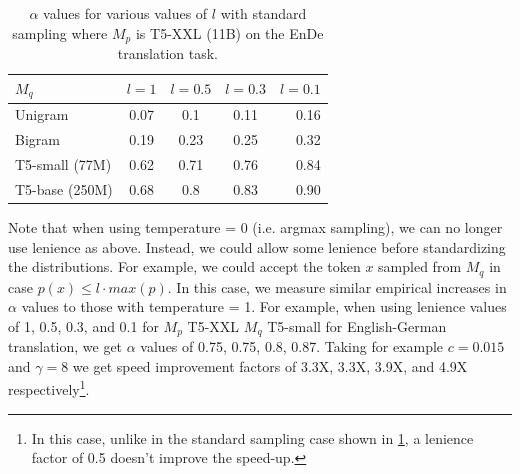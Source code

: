 \documentclass[nohyperref]{article}
\theoremstyle{plain}
\theoremstyle{definition}
\theoremstyle{remark}
\begin{document}
\begin{table}[ht]
  \caption{$\alpha$ values for various values of $l$ with standard sampling where $M_p$ is T5-XXL (11B) on the EnDe translation task.}
  \label{tbl:lenience}
\vskip 0.15in
\begin{center}
\begin{small}
\begin{sc}
\begin{tabular}{lcccr}
\toprule
$M_q$ & $l=1$ & $l=0.5$ & $l=0.3$ & $l=0.1$ \\
\midrule
    Unigram         & 0.07 & 0.1    & 0.11  & 0.16 \\
    Bigram          & 0.19 & 0.23   & 0.25  & 0.32\\
    T5-small (77M)  & 0.62 & 0.71   & 0.76  & 0.84\\
    T5-base (250M)  & 0.68 & 0.8    & 0.83  & 0.90\\
\bottomrule
\end{tabular}
\end{sc}
\end{small}
\end{center}
\vskip -0.1in
\end{table}


Note that when using temperature = 0 (i.e. argmax sampling), we can no longer use lenience as above. Instead, we could allow some lenience before standardizing the distributions. For example, we could accept the token $x$ sampled from $M_q$ in case $p(x) \leq l \cdot max(p)$. In this case, we measure similar empirical increases in $\alpha$ values to those with temperature = 1. For example, when using lenience values of 1, 0.5, 0.3, and 0.1 for $M_p$ T5-XXL $M_q$ T5-small for English-German translation, we get $\alpha$ values of 0.75, 0.75, 0.8, 0.87. Taking for example $c=0.015$ and $\gamma=8$ we get speed improvement factors of 3.3X, 3.3X, 3.9X, and 4.9X respectively\footnote{In this case, unlike in the standard sampling case shown in \cref{tbl:lenience}, a lenience factor of 0.5 doesn't improve the speed-up.}.




\end{document}
